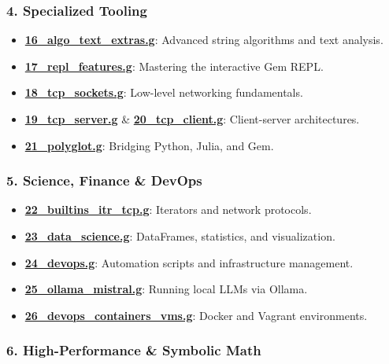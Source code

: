 \documentclass[
]{article}
\providecommand{\tightlist}{%
  \setlength{\itemsep}{0pt}\setlength{\parskip}{0pt}}
\begin{document}
\subsubsection{4. Specialized Tooling}\label{specialized-tooling}

\begin{itemize}
\tightlist
\item
  \textbf{\url{16_algo_text_extras.g}}: Advanced string algorithms and
  text analysis.
\item
  \textbf{\url{17_repl_features.g}}: Mastering the interactive Gem REPL.
\item
  \textbf{\url{18_tcp_sockets.g}}: Low-level networking fundamentals.
\item
  \textbf{\url{19_tcp_server.g}} \& \textbf{\url{20_tcp_client.g}}:
  Client-server architectures.
\item
  \textbf{\url{21_polyglot.g}}: Bridging Python, Julia, and Gem.
\end{itemize}

\subsubsection{5. Science, Finance \&
DevOps}\label{science-finance-devops}

\begin{itemize}
\tightlist
\item
  \textbf{\url{22_builtins_itr_tcp.g}}: Iterators and network protocols.
\item
  \textbf{\url{23_data_science.g}}: DataFrames, statistics, and
  visualization.
\item
  \textbf{\url{24_devops.g}}: Automation scripts and infrastructure
  management.
\item
  \textbf{\url{25_ollama_mistral.g}}: Running local LLMs via Ollama.
\item
  \textbf{\url{26_devops_containers_vms.g}}: Docker and Vagrant
  environments.
\end{itemize}

\subsubsection{6. High-Performance \& Symbolic
Math}\label{high-performance-symbolic-math}
\end{document}
